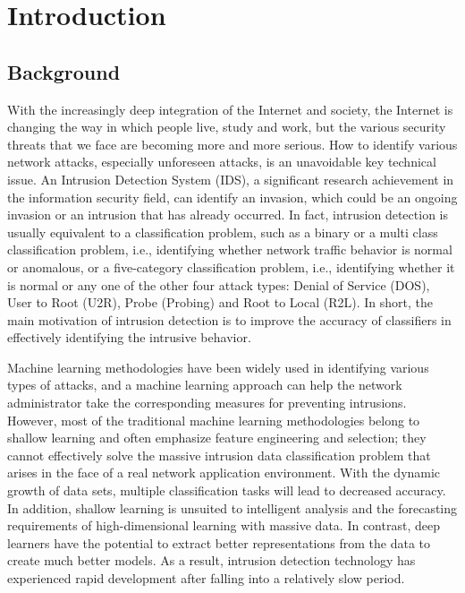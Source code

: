 
\newpage
{} %

\chapter{Introduction}
\vspace{-18pt}
\section{Background}\label{sec:bkgrnd}%
\vspace{-18pt}
With the increasingly deep integration of the Internet and society, the Internet is changing the way in which people live, study and work, but the various security threats that we face are becoming more and more serious. How to identify various network attacks, especially unforeseen attacks, is an unavoidable key technical issue. An Intrusion Detection System (IDS), a significant research achievement in the information security field, can identify an invasion, which could be an ongoing invasion or an intrusion that has already occurred. In fact, intrusion detection is usually equivalent to a classification problem, such as a binary or a multi class classification problem, i.e., identifying whether network traffic behavior is normal or anomalous, or a five-category classification problem, i.e., identifying whether it is normal or any one of the other four attack types: Denial of Service (DOS), User to Root (U2R), Probe (Probing) and Root to Local (R2L). In short, the main motivation of intrusion detection is to improve the accuracy of classifiers in effectively identifying the intrusive behavior.\par
Machine learning methodologies have been widely used in identifying various types of attacks, and a machine learning approach can help the network administrator take the corresponding measures for preventing intrusions. However, most of the traditional machine learning methodologies belong to shallow learning and often emphasize feature engineering and selection; they cannot effectively solve the massive intrusion data classification problem that arises in the face of a real network application environment. With the dynamic growth of data sets, multiple classification tasks will lead to decreased accuracy. In addition, shallow learning is unsuited to intelligent analysis and the forecasting requirements of high-dimensional learning with massive data. In contrast, deep learners have the potential to extract better representations from the data to create much better models. As a result, intrusion detection technology has experienced rapid development after falling into a relatively slow period.\cite{yin2017deep}%

